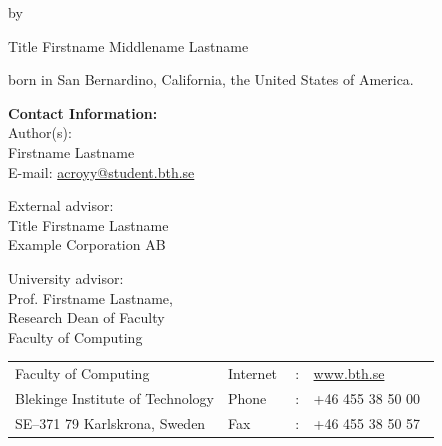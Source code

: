 {\begin{center}
		\par\vspace{1cm}
		\begin{large}
			by
		\end{large}

		\par\vspace{1cm}
		\begin{Large}
			Title Firstname Middlename Lastname
		\end{Large}

		\par\vspace{0.5cm}
		\begin{large}
			born in San Bernardino, California, the United States of America.
		\end{large}
	\end{center}

	\clearpage

	\textbf{Contact Information:}\\
	Author(s):\\
	Firstname Lastname \\
	E-mail: \href{mailto:acroyy@student.bth.se}{acroyy@student.bth.se}

	\bigskip

	External advisor: \\
	Title Firstname Lastname\\
	Example Corporation AB

	\bigskip

	University advisor:\\
	Prof. Firstname Lastname,\\
	Research Dean of Faculty\\ %
	Faculty of Computing

	\vfill

	\begin{tabular}{p{0.5\linewidth}lcl}
		Faculty of Computing				& Internet	& : & \href{http://www.bth.se}{www.bth.se}\\
		Blekinge Institute of Technology	& Phone		& : & +46 455 38 50 00\\
		SE--371 79 Karlskrona, Sweden		& Fax		& : & +46 455 38 50 57\\
	\end{tabular}

	\bigskip \bigskip %

	\clearpage
}
